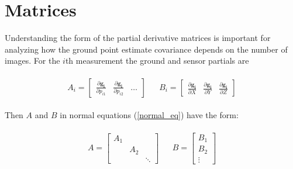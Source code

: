 \documentclass[]{article}
\begin{document}
\section*{Matrices}
Understanding the form of the partial derivative matrices is important for analyzing how the ground point estimate covariance depends on the number of images.  For the $i$th measurement the ground and sensor partials are

\begin{align}\label{ith_partials}
\begin{aligned}
A_{i} = 
\begin{bmatrix}
\frac{\partial{\pmb{g_i}}}{\partial{p_{i1}}} & \frac{\partial{\pmb{g_i}}}{\partial{p_{i2}}} & \ldots
\end{bmatrix}  
&& 
B_{i} =
\begin{bmatrix}
\frac{\partial{\pmb{g_i}}}{\partial{X}} & \frac{\partial{\pmb{g_i}}}{\partial{Y}} & \frac{\partial{\pmb{g_i}}}{\partial{Z}}
\end{bmatrix}
\end{aligned}
\end{align}

Then $A$ and $B$ in normal equations (\ref{normal_eq}) have the form:

\begin{align}\label{full_partials}
\begin{aligned}
A = 
\begin{bmatrix}
A_{1} &  & \\
& 	A_{2} \\
&   & \ddots
\end{bmatrix}
&& 
B = 
\begin{bmatrix}
B_{1}  \\
B_{2} \\
\vdots
\end{bmatrix}
\end{aligned}
\end{align}
\end{document}
